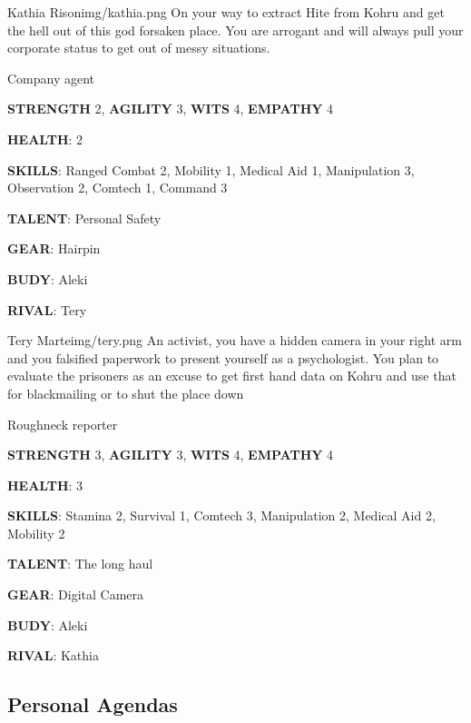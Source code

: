 \begin{rpg-pcbox}{Kathia Rison}{img/kathia.png}
    On your way to extract Hite from Kohru and get the hell out of this god forsaken place.
    You are arrogant and will always pull your corporate status to get out of messy situations.
\end{rpg-pcbox}

\begin{rpg-commentbox}{}
    Company agent

    \textbf{STRENGTH} 2, \textbf{AGILITY} 3, \textbf{WITS} 4, \textbf{EMPATHY} 4

    \textbf{HEALTH}: 2

    \textbf{SKILLS}: Ranged Combat 2, Mobility 1, Medical Aid 1, Manipulation 3, Observation 2, Comtech 1, Command 3
    
    \textbf{TALENT}: Personal Safety
    
    \textbf{GEAR}: Hairpin

    \textbf{BUDY}: Aleki
    
    \textbf{RIVAL}: Tery
\end{rpg-commentbox}


\newsect

\begin{rpg-pcbox}{Tery Marte}{img/tery.png}
    An activist, you have a hidden camera in your right arm and you falsified paperwork to present yourself as a psychologist. You plan to evaluate the prisoners as an excuse to get first hand data on Kohru and use that for blackmailing or to shut the place down
\end{rpg-pcbox}

\begin{rpg-commentbox}{}
    Roughneck reporter

    \textbf{STRENGTH} 3, \textbf{AGILITY} 3, \textbf{WITS} 4, \textbf{EMPATHY} 4

    \textbf{HEALTH}: 3

    \textbf{SKILLS}: Stamina 2, Survival 1, Comtech 3, Manipulation 2, Medical Aid 2, Mobility 2
    
    \textbf{TALENT}: The long haul
    
    \textbf{GEAR}: Digital Camera

    
    \textbf{BUDY}: Aleki
    
    \textbf{RIVAL}: Kathia
\end{rpg-commentbox}


\clearpage

\subsection{Personal Agendas}

